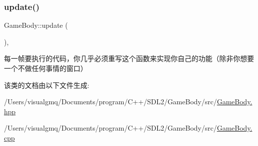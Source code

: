 \subsubsection{\texorpdfstring{update()}{update()}}
{\footnotesize\ttfamily Game\+Body\+::update (\begin{DoxyParamCaption}{ }\end{DoxyParamCaption})\hspace{0.3cm}{\ttfamily [inline]}, {\ttfamily [virtual]}}



每一帧要执行的代码，你几乎必须重写这个函数来实现你自己的功能（除非你想要一个不做任何事情的窗口） 



该类的文档由以下文件生成\+:\begin{DoxyCompactItemize}
\item 
/\+Users/visualgmq/\+Documents/program/\+C++/\+S\+D\+L2/\+Game\+Body/src/\mbox{\hyperlink{_game_body_8hpp}{Game\+Body.\+hpp}}\item 
/\+Users/visualgmq/\+Documents/program/\+C++/\+S\+D\+L2/\+Game\+Body/src/\mbox{\hyperlink{_game_body_8cpp}{Game\+Body.\+cpp}}\end{DoxyCompactItemize}
